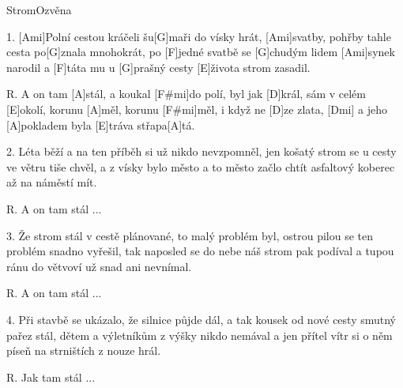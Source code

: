 \begin{song}{Strom}{Ozvěna}

\begin{xverse}{1. }
[Ami]Polní cestou kráčeli šu[G]maři do vísky hrát,
[Ami]svatby, pohřby tahle cesta po[G]znala mnohokrát,
po [F]jedné svatbě se [G]chudým lidem [Ami]synek narodil
a [F]táta mu u [G]prašný cesty [E]{}života strom zasadil.
\end{xverse}

\begin{xverse}{R. }
A on tam [A]stál, a koukal [F#mi]do polí,
byl jak [D]král, sám v celém [E]okolí,
korunu [A]měl, korunu [F#mi]měl, i když ne [D]ze zlata, [Dmi]{}
a jeho [A]pokladem byla [E]tráva střapa[A]tá.
\end{xverse}

\begin{xverse}{2. }
Léta běží a na ten příběh si už nikdo nevzpomněl,
jen košatý strom se u cesty ve větru tiše chvěl,
a z vísky bylo město a to město začlo chtít
asfaltový koberec až na náměstí mít.
\end{xverse}

\begin{xverse}{R. }
A on tam stál ...
\end{xverse}

\begin{xverse}{3. }
Že strom stál v cestě plánované, to malý problém byl,
ostrou pilou se ten problém snadno vyřešil,
tak naposled se do nebe náš strom pak podíval
a tupou ránu do větvoví už snad ani nevnímal.
\end{xverse}

\begin{xverse}{R. }
A on tam stál ...
\end{xverse}


\begin{xverse}{4. }
Při stavbě se ukázalo, že silnice půjde dál,
a tak kousek od nové cesty smutný pařez stál,
dětem a výletníkům z výšky nikdo nemával
a jen přítel vítr si o něm píseň na strništích z nouze hrál.
\end{xverse}


\begin{xverse}{R. }
Jak tam stál ...
\end{xverse}

\end{song}

